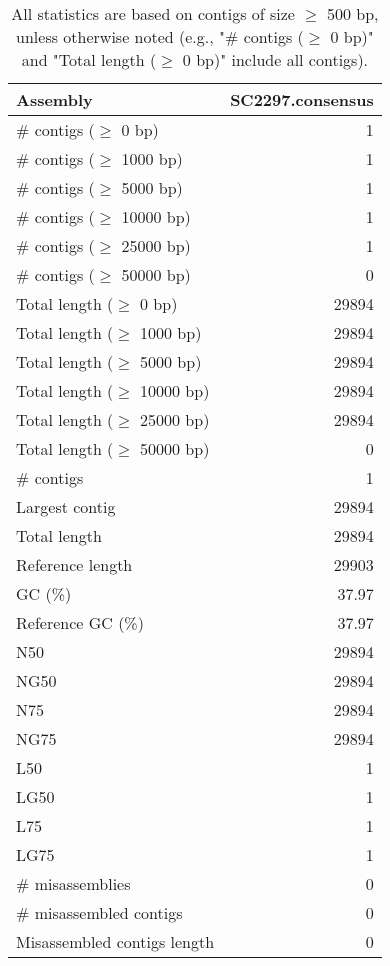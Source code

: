 \documentclass[12pt,a4paper]{article}
\begin{document}
\begin{table}[ht]
\begin{center}
\caption{All statistics are based on contigs of size $\geq$ 500 bp, unless otherwise noted (e.g., "\# contigs ($\geq$ 0 bp)" and "Total length ($\geq$ 0 bp)" include all contigs).}
\begin{tabular}{|l*{1}{|r}|}
\hline
Assembly & SC2297.consensus \\ \hline
\# contigs ($\geq$ 0 bp) & 1 \\ \hline
\# contigs ($\geq$ 1000 bp) & 1 \\ \hline
\# contigs ($\geq$ 5000 bp) & 1 \\ \hline
\# contigs ($\geq$ 10000 bp) & 1 \\ \hline
\# contigs ($\geq$ 25000 bp) & 1 \\ \hline
\# contigs ($\geq$ 50000 bp) & 0 \\ \hline
Total length ($\geq$ 0 bp) & 29894 \\ \hline
Total length ($\geq$ 1000 bp) & 29894 \\ \hline
Total length ($\geq$ 5000 bp) & 29894 \\ \hline
Total length ($\geq$ 10000 bp) & 29894 \\ \hline
Total length ($\geq$ 25000 bp) & 29894 \\ \hline
Total length ($\geq$ 50000 bp) & 0 \\ \hline
\# contigs & 1 \\ \hline
Largest contig & 29894 \\ \hline
Total length & 29894 \\ \hline
Reference length & 29903 \\ \hline
GC (\%) & 37.97 \\ \hline
Reference GC (\%) & 37.97 \\ \hline
N50 & 29894 \\ \hline
NG50 & 29894 \\ \hline
N75 & 29894 \\ \hline
NG75 & 29894 \\ \hline
L50 & 1 \\ \hline
LG50 & 1 \\ \hline
L75 & 1 \\ \hline
LG75 & 1 \\ \hline
\# misassemblies & 0 \\ \hline
\# misassembled contigs & 0 \\ \hline
Misassembled contigs length & 0 \\ \hline

\end{tabular}
\end{center}
\end{table}
\end{document}
